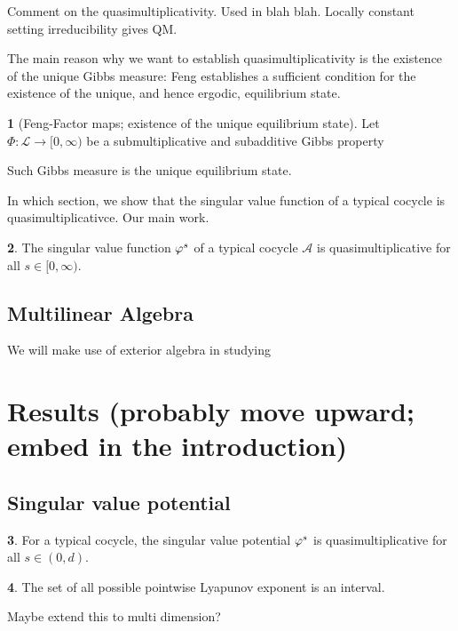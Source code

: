 \documentclass[11pt,oneside,reqno]{amsart}
\numberwithin{equation}{section}
\numberwithin{figure}{section}
\theoremstyle{definition}
\newtheorem{thm}{\protect\theoremname}[section]
\theoremstyle{definition}
\theoremstyle{definition}
\theoremstyle{definition}
\theoremstyle{remark}
\theoremstyle{definition}
\theoremstyle{definition}
\theoremstyle{definition}
\newtheorem{prop}[thm]{\protect\propositionname}
\def\A{\mathcal{A}}
\def\L{\mathcal{L}}
\def\vps{\vphi^s}
\providecommand{\propositionname}{Proposition}
\providecommand{\theoremname}{Theorem}
\providecommand{\theoremname}{Theorem}
\begin{document}
Comment on the quasimultiplicativity. Used in blah blah. Locally constant setting irreducibility gives QM.

The main reason why we want to establish quasimultiplicativity is the existence of the unique Gibbs measure: Feng establishes a sufficient condition for the existence of the unique, and hence ergodic, equilibrium state. 
\begin{prop}[Feng-Factor maps; existence of the unique equilibrium state]
Let $\Phi \colon \L \to [0,\infty)$ be a submultiplicative and subadditive 
Gibbs property
\end{prop}

Such Gibbs measure is the unique equilibrium state.


In which section, we show that the singular value function of a typical cocycle is quasimultiplicativce. Our main work.
\begin{prop}
The singular value function $\vps$ of a typical cocycle $\A$ is quasimultiplicative for all $s \in [0,\infty)$.
\end{prop} 
 


\subsection{Multilinear Algebra}
We will make use of exterior algebra in studying 


\section{Results (probably move upward; embed in the introduction)}



\subsection{Singular value potential}
\begin{thm}
For a typical cocycle, the singular value potential $\vps$ is quasimultiplicative for all $s \in (0,d)$.
\end{thm}


\begin{thm}
The set of all possible pointwise Lyapunov exponent is an interval. 
\end{thm}
Maybe extend this to multi dimension?
\end{document}
